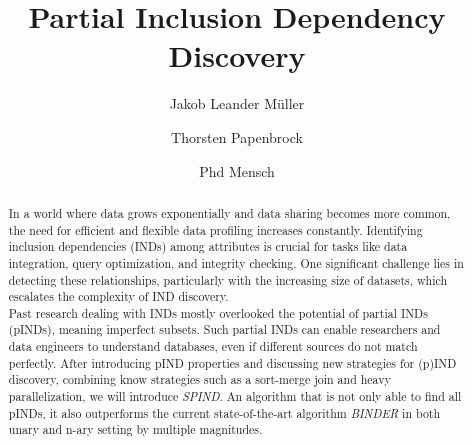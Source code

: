 \documentclass[sigconf, nonacm]{acmart}
\begin{document}
\title{Partial Inclusion Dependency Discovery}

\author{Jakob Leander Müller}

\author{Thorsten Papenbrock}

\author{Phd Mensch}

\begin{abstract}
In a world where data grows exponentially and data sharing becomes more common, the need for efficient and flexible data profiling increases constantly.  Identifying inclusion dependencies (INDs) among attributes is crucial for tasks like data integration, query optimization, and integrity checking. One significant challenge lies in detecting these relationships, particularly with the increasing size of datasets, which escalates the complexity of IND discovery. \\
Past research dealing with INDs mostly overlooked the potential of partial INDs (pINDs), meaning imperfect subsets. Such partial INDs can enable researchers and data engineers to understand databases, even if different sources do not match perfectly. After introducing pIND properties and discussing new strategies for (p)IND discovery, combining know strategies such as a sort-merge join and heavy parallelization, we will introduce \textit{SPIND}. An algorithm that is not only able to find all pINDs, it also outperforms the current state-of-the-art algorithm \textit{BINDER} in both unary and n-ary setting by multiple magnitudes.
\end{abstract}

\maketitle
\end{document}
